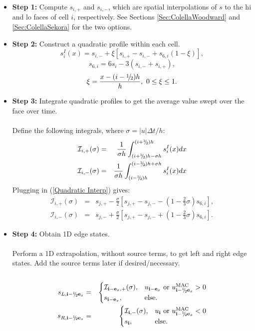 \begin{itemize}
\item {\bf Step 1:} Compute $s_{i,+}$ and $s_{i,-}$, which are spatial interpolations of
$s$ to the hi and lo faces of cell $i$, respectively.  See Sections 
\ref{Sec:ColellaWoodward} and \ref{Sec:ColellaSekora} for the two options.
\item {\bf Step 2:} Construct a quadratic profile within each cell.
\begin{equation}
s_i^I(x) = s_{i,-} + \xi\left[s_{i,+} - s_{i,-} + s_{6,i}(1-\xi)\right],\label{Quadratic Interp}
\end{equation}
\begin{equation}
s_{6,i}= 6s_{i} - 3\left(s_{i,-}+s_{i,+}\right),
\end{equation}
\begin{equation}
\xi = \frac{x - (i-\myhalf)h}{h}, ~ 0 \le \xi \le 1.
\end{equation}
\item {\bf Step 3:} Integrate quadratic profiles to get the average value swept over the face
over time.\\ \\
Define the following integrals, where $\sigma = |u|\Delta t/h$:
\begin{eqnarray}
\mathcal{I}_{i,+}(\sigma) &=& \frac{1}{\sigma h}\int_{(i+\myhalf)h-\sigma h}^{(i+\myhalf)h}s_i^I(x)dx \\
\mathcal{I}_{i,-}(\sigma) &=& \frac{1}{\sigma h}\int_{(i-\myhalf)h}^{(i-\myhalf)h+\sigma h}s_i^I(x)dx
\end{eqnarray}
Plugging in (\ref{Quadratic Interp}) gives:
\begin{eqnarray}
\mathcal{I}_{i,+}(\sigma) &=& s_{j,+} - \frac{\sigma}{2}\left[s_{j,+}-s_{j,-}-\left(1-\frac{2}{3}\sigma\right)s_{6,i}\right], \\
\mathcal{I}_{i,-}(\sigma) &=& s_{j,-} + \frac{\sigma}{2}\left[s_{j,+}-s_{j,-}+\left(1-\frac{2}{3}\sigma\right)s_{6,i}\right].
\end{eqnarray}
\item {\bf Step 4:} Obtain 1D edge states.\\ \\
Perform a 1D extrapolation, without source terms, to get 
left and right edge states.  Add the source terms later if desired/necessary.\\ \\
\begin{eqnarray}
s_{L,\ib-\myhalf\eb_x} &=&
\begin{cases}
\mathcal{I}_{\ib-\eb_x,+}(\sigma), & u_{\ib-\eb_x} ~ \text{or} ~ u_{\ib-\myhalf\eb_x}^{\mac} > 0 \\
s_{\ib-\eb_x}, & \text{else}.
\end{cases}\\
s_{R,\ib-\myhalf\eb_x} &=& 
\begin{cases}
\mathcal{I}_{\ib,-}(\sigma), & u_{\ib} ~ \text{or} ~ u_{\ib-\myhalf\eb_x}^{\mac} < 0 \\
s_{\ib}, & \text{else}.
\end{cases}
\end{eqnarray}
\end{itemize}

